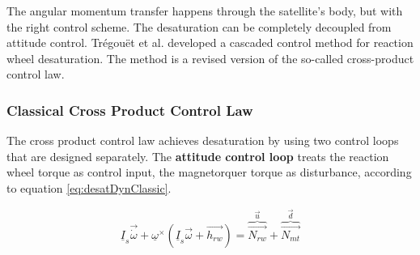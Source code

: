 The angular momentum transfer happens through the satellite's body, but with the right control scheme. The desaturation can be completely decoupled from attitude control. Trégouët et al. \cite{DesatTregouet} developed a cascaded control method for reaction wheel desaturation. The method is a revised version of the so-called cross-product control law. 
%
%
%
%


\subsubsection{Classical Cross Product Control Law}

The cross product control law achieves desaturation by using two control loops that are designed separately. The \textbf{attitude control loop} treats the reaction wheel torque as control input, the magnetorquer torque as disturbance, according to equation \ref{eq:desatDynClassic}.

\begin{equation}
\underline I_{s} \vec{\dot{\omega}} + \underline{\omega}^\times(\underline I_{s} \vec{\omega} + \vec{h_{rw}})  =    \overbrace{ \vec{N_{rw}}}^{\vec{u}} +  \overbrace{\vec{N_{mt}}}^{\vec{d}}
\label{eq:desatDynClassic}
\end{equation}



